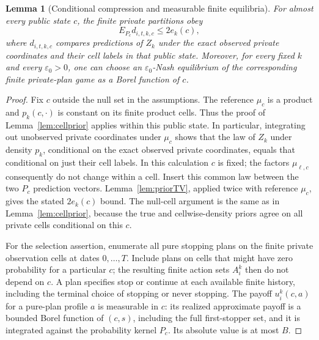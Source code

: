 \documentclass[11pt]{article}
\newtheorem{lemma}[theorem]{Lemma}
\theoremstyle{remark}\newtheorem{remark}[theorem]{Remark}
\begin{document}
\begin{lemma}[Conditional compression and measurable finite equilibria]
\label{publiclemma}
For almost every public state $c$, the finite private partitions obey
\[
 E_{P_c}d_{i,t,k,c}\leq2e_k(c),
\]
where $d_{i,t,k,c}$ compares predictions of $Z_k$ under the exact
observed private coordinates and their cell labels in that public state.
Moreover, for every fixed $k$ and every $\varepsilon_0>0$, one can
choose an $\varepsilon_0$-Nash equilibrium of the corresponding finite
private-plan game as a Borel function of $c$.
\end{lemma}
\begin{proof}
Fix $c$ outside the null set in the assumptions. The reference $\mu_c$
is a product and $p_k(c,\cdot)$ is constant on its finite product cells.
Thus the proof of Lemma~\ref{lem:cellprior} applies within this public
state. In particular, integrating out unobserved private coordinates
under $\mu_c$ shows that the law of $Z_k$ under density $p_k$,
conditional on the exact observed private coordinates, equals that
conditional on just their cell labels. In this calculation $c$ is fixed;
the factors $\mu_{\ell,c}$ consequently do not change within a cell.
Insert this common law between the two $P_c$ prediction vectors.
Lemma~\ref{lem:priorTV}, applied twice with reference $\mu_c$, gives
the stated $2e_k(c)$ bound. The null-cell argument is the same as in
Lemma~\ref{lem:cellprior}, because the true and cellwise-density priors
agree on all private cells conditional on this $c$.

For the selection assertion, enumerate all pure stopping plans on the
finite private observation cells at dates $0,\ldots,T$. Include plans
on cells that might have zero probability for a particular $c$; the
resulting finite action sets $A_i^k$ then do not depend on $c$.
A plan specifies stop or continue at each available finite history,
including the terminal choice of stopping or never stopping. The payoff
$u_i^k(c,a)$ for a pure-plan profile $a$ is measurable in $c$: its
realized approximate payoff is a bounded Borel function of $(c,s)$,
including the full first-stopper set, and it is integrated against the
probability kernel $P_c$. Its absolute value is at most $B$.


\end{proof}
\end{document}
